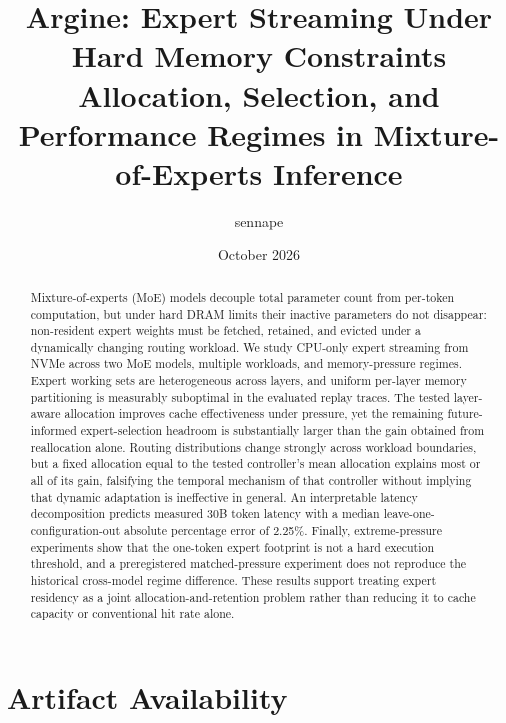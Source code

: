 \documentclass[11pt]{article}
\title{\textbf{Argine: Expert Streaming Under Hard Memory Constraints}\\
\large Allocation, Selection, and Performance Regimes in Mixture-of-Experts Inference}
\author{sennape}
\date{October 2026}
\begin{document}
\maketitle

\begin{abstract}
Mixture-of-experts (MoE) models decouple total parameter count from per-token computation, but under hard DRAM limits their inactive parameters do not disappear: non-resident expert weights must be fetched, retained, and evicted under a dynamically changing routing workload. We study CPU-only expert streaming from NVMe across two MoE models, multiple workloads, and memory-pressure regimes. Expert working sets are heterogeneous across layers, and uniform per-layer memory partitioning is measurably suboptimal in the evaluated replay traces. The tested layer-aware allocation improves cache effectiveness under pressure, yet the remaining future-informed expert-selection headroom is substantially larger than the gain obtained from reallocation alone. Routing distributions change strongly across workload boundaries, but a fixed allocation equal to the tested controller's mean allocation explains most or all of its gain, falsifying the temporal mechanism of that controller without implying that dynamic adaptation is ineffective in general. An interpretable latency decomposition predicts measured 30B token latency with a median leave-one-configuration-out absolute percentage error of 2.25\%. Finally, extreme-pressure experiments show that the one-token expert footprint is not a hard execution threshold, and a preregistered matched-pressure experiment does not reproduce the historical cross-model regime difference. These results support treating expert residency as a joint allocation-and-retention problem rather than reducing it to cache capacity or conventional hit rate alone.
\end{abstract}














\section*{Artifact Availability}
\end{document}
